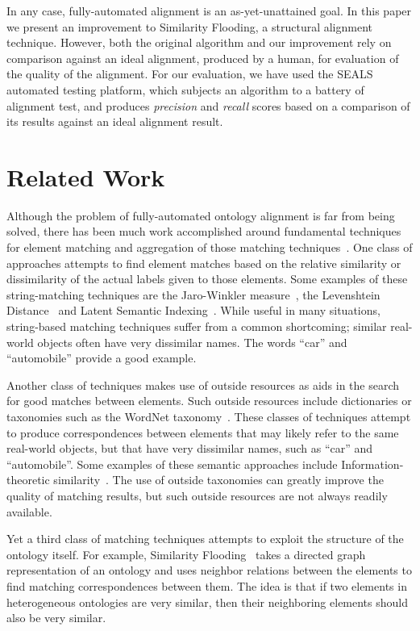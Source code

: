 \documentclass[letterpaper,twocolumn,12pt]{article}
\begin{document}
In any case, fully-automated alignment is an as-yet-unattained goal. 
In this paper we present an improvement to Similarity Flooding, a structural alignment technique. 
However, both the original algorithm and our improvement rely on comparison against an ideal alignment, produced by a human, for evaluation of the quality of the alignment. 
For our evaluation, we have used the SEALS automated testing platform, which subjects an algorithm to a battery of alignment test, and produces \textit{precision} and \textit{recall} scores based on a comparison of its results against an ideal alignment result.

\section{Related Work}

Although the problem of fully-automated ontology alignment is far from being solved, there has been much work accomplished around fundamental techniques for element matching and aggregation of those matching techniques~\cite{euzenat:2007:ontology}.
One class of approaches attempts to find element matches based on the relative similarity or dissimilarity of the actual labels given to those elements. 
Some examples of these string-matching techniques are the Jaro-Winkler measure~\cite{winkler:1999:state}, the Levenshtein Distance~\cite{yujian:2007:levenshtein} and Latent Semantic Indexing~\cite{benzecri:1973:lsi}.
%
While useful in many situations, string-based matching techniques suffer from a common shortcoming; similar real-world objects often have very dissimilar names. 
The words ``car'' and ``automobile'' provide a good example.

Another class of techniques makes use of outside resources as aids in the search for good matches between elements. 
Such outside resources include dictionaries or taxonomies such as the WordNet taxonomy~\cite{miller:1995:wordnet}. 
These classes of techniques attempt to produce correspondences between elements that may likely refer to the same real-world objects, but that have very dissimilar names, such as ``car'' and ``automobile''. 
Some examples of these semantic approaches include Information-theoretic similarity~\cite{lin:1998:information}.
%
The use of outside taxonomies can greatly improve the quality of matching results, but such outside resources are not always readily available.

Yet a third class of matching techniques attempts to exploit the structure of the ontology itself. 
For example, Similarity Flooding~\cite{melnik:2002:similarity} takes a directed graph representation of an ontology and uses neighbor relations between the elements to find matching correspondences between them. 
The idea is that if two elements in heterogeneous ontologies are very similar, then their neighboring elements should also be very similar.
\end{document}
